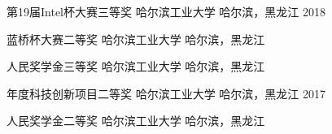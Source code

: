 


\vspace{-1.5mm}
\begin{cvhonors}

\cvhonor
{第19届Intel杯大赛三等奖} %
{哈尔滨工业大学} %
{哈尔滨，黑龙江} %
{2018} %

\cvhonor
{蓝桥杯大赛二等奖} %
{哈尔滨工业大学} %
{哈尔滨，黑龙江} %
{} %


\cvhonor
{人民奖学金三等奖} %
{哈尔滨工业大学} %
{哈尔滨，黑龙江} %
{} %


\cvhonor
{年度科技创新项目二等奖} %
{哈尔滨工业大学} %
{哈尔滨，黑龙江} %
{2017} %


\cvhonor
{人民奖学金二等奖} %
{哈尔滨工业大学} %
{哈尔滨，黑龙江} %
{} %

\end{cvhonors}